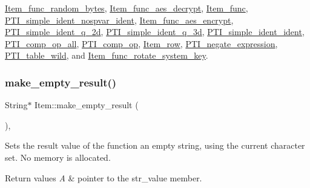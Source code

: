 \mbox{\hyperlink{classItem__func__random__bytes_a77c8913964a4f190b23343325d813d28}{Item\+\_\+func\+\_\+random\+\_\+bytes}}, \mbox{\hyperlink{classItem__func__aes__decrypt_aba543513adc92c354596ad9d3b81ba9c}{Item\+\_\+func\+\_\+aes\+\_\+decrypt}}, \mbox{\hyperlink{classItem__func_a6413cdbe7b14be77cc47462c9fc87ddb}{Item\+\_\+func}}, \mbox{\hyperlink{classPTI__simple__ident__nospvar__ident_ae6b43df14f3a747e60825b879e3b923c}{P\+T\+I\+\_\+simple\+\_\+ident\+\_\+nospvar\+\_\+ident}}, \mbox{\hyperlink{classItem__func__aes__encrypt_a3dea8d64bcdabb7dabe2f2e76959408c}{Item\+\_\+func\+\_\+aes\+\_\+encrypt}}, \mbox{\hyperlink{classPTI__simple__ident__q__2d_a1cd2321d602048802e283a067c2bb986}{P\+T\+I\+\_\+simple\+\_\+ident\+\_\+q\+\_\+2d}}, \mbox{\hyperlink{classPTI__simple__ident__q__3d_ad94d0e373c6cb86832c3206b706eaf0b}{P\+T\+I\+\_\+simple\+\_\+ident\+\_\+q\+\_\+3d}}, \mbox{\hyperlink{classPTI__simple__ident__ident_ae9ddbaf6e11a794be2f831c7b8321e86}{P\+T\+I\+\_\+simple\+\_\+ident\+\_\+ident}}, \mbox{\hyperlink{classPTI__comp__op__all_a790ee351d642e9f8e7329b598b69eba0}{P\+T\+I\+\_\+comp\+\_\+op\+\_\+all}}, \mbox{\hyperlink{classPTI__comp__op_a934bb7f11536d59eea997d9ac5e276aa}{P\+T\+I\+\_\+comp\+\_\+op}}, \mbox{\hyperlink{classItem__row_af0e050bb8e5b8942ac7d27da01ab897b}{Item\+\_\+row}}, \mbox{\hyperlink{classPTI__negate__expression_acfb830168ceffe8ca4563665a1016297}{P\+T\+I\+\_\+negate\+\_\+expression}}, \mbox{\hyperlink{classPTI__table__wild_a4f54c9332727d8f233f86fe0cdf6bf60}{P\+T\+I\+\_\+table\+\_\+wild}}, and \mbox{\hyperlink{classItem__func__rotate__system__key_a9fb9f671f7e7e6cc30d52cf84be06237}{Item\+\_\+func\+\_\+rotate\+\_\+system\+\_\+key}}.

\mbox{\label{classItem_ad087824772daf5ea1dad82d52b16255c}} 
\subsubsection{\texorpdfstring{make\+\_\+empty\+\_\+result()}{make\_empty\_result()}}
{\footnotesize\ttfamily String$\ast$ Item\+::make\+\_\+empty\+\_\+result (\begin{DoxyParamCaption}{ }\end{DoxyParamCaption})\hspace{0.3cm}{\ttfamily [inline]}, {\ttfamily [protected]}}

Sets the result value of the function an empty string, using the current character set. No memory is allocated. 
\begin{DoxyRetVals}{Return values}
{\em A} & pointer to the str\+\_\+value member. \\
\hline
\end{DoxyRetVals}
\mbox{\label{classItem_a4380479e68d46a2d719e4a0f5c2ee25e}} 
